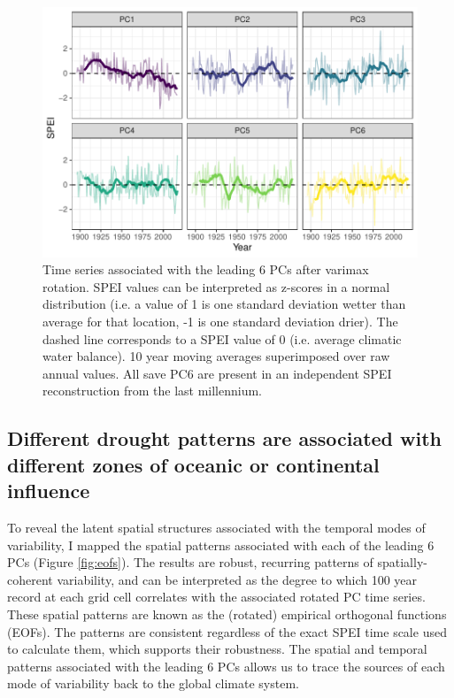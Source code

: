 \documentclass[11pt]{iopart}
\begin{document}
\begin{figure}[!ht]
\centering
\includegraphics[width=.7\linewidth]{figures/pc_obs.pdf}
\caption{Time series associated with the leading 6 PCs after varimax rotation. SPEI values can be interpreted as z-scores in a normal distribution (i.e. a value of 1 is one standard deviation wetter than average for that location, -1 is one standard deviation drier). The dashed line corresponds to a SPEI value of 0 (i.e. average climatic water balance). 10 year moving averages superimposed over raw annual values. All save PC6 are present in an independent SPEI reconstruction from the last millennium.}
\label{fig:pc-obs}
\end{figure}

\subsection*{Different drought patterns are associated with different zones of oceanic or continental influence}
To reveal the latent spatial structures associated with the temporal modes of variability, I mapped the spatial patterns associated with each of the leading 6 PCs (Figure \ref{fig:eofs}). The results are robust, recurring patterns of spatially-coherent variability, and can be interpreted as the degree to which 100 year record at each grid cell correlates with the associated rotated PC time series. These spatial patterns are known as the (rotated) empirical orthogonal functions (EOFs). The patterns are consistent regardless of the exact SPEI time scale used to calculate them, which supports their robustness. The spatial and temporal patterns associated with the leading 6 PCs allows us to trace the sources of each mode of variability back to the global climate system.
\end{document}
